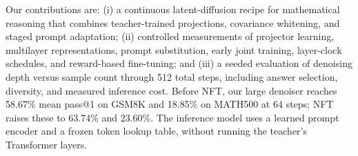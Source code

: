 Our contributions are: (i) a continuous latent-diffusion recipe for mathematical reasoning that combines teacher-trained projections, covariance whitening, and staged prompt adaptation; (ii) controlled measurements of projector learning, multilayer representations, prompt substitution, early joint training, layer-clock schedules, and reward-based fine-tuning; and (iii) a seeded evaluation of denoising depth versus sample count through 512 total steps, including answer selection, diversity, and measured inference cost. Before NFT, our large denoiser reaches 58.67\% mean pass@1 on GSM8K and 18.85\% on MATH500 at 64 steps; NFT raises these to 63.74\% and 23.60\%. The inference model uses a learned prompt encoder and a frozen token lookup table, without running the teacher's Transformer layers.
